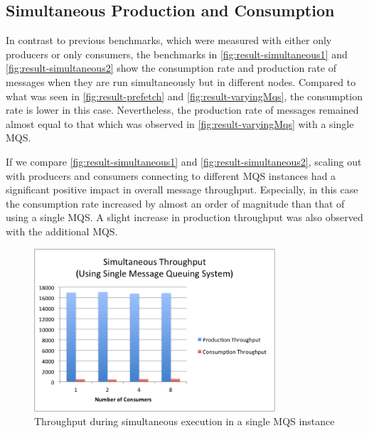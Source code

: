 \subsection{Simultaneous Production and Consumption}
\label{subsec:simultaneous}
  In contrast to previous benchmarks, which were measured with either only producers or only consumers, the benchmarks in \autoref{fig:result-simultaneous1} and \autoref{fig:result-simultaneous2} show the consumption rate and production rate of messages when they are run simultaneously but in different nodes. Compared to what was seen in \autoref{fig:result-prefetch} and
  \autoref{fig:result-varyingMqs}, the consumption rate is lower in this case. Nevertheless, the production rate of messages remained almost equal to that which was observed in \autoref{fig:result-varyingMqs} with a single MQS.

  If we compare \autoref{fig:result-simultaneous1} and \autoref{fig:result-simultaneous2}, scaling out with producers and consumers connecting to different MQS instances had a significant positive impact in overall message throughput. Especially, in this case the consumption rate increased by almost an order of magnitude than that of using a single MQS. A slight increase in production throughput was also observed with the additional MQS.

\begin{figure}[H]
  \centering
  \includegraphics[width=0.8\textwidth]{figures/07simultaneous1}
  \caption[Throughput during simultaneous execution in single MQS]{Throughput during simultaneous execution in a single MQS instance}
  \label{fig:result-simultaneous1}
\end{figure}

